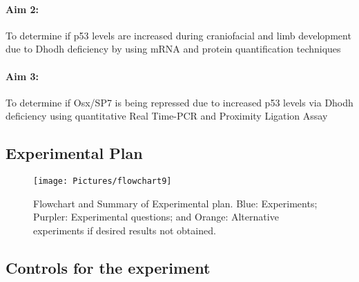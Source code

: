 \documentclass[12pt]{article}
\begin{document}
\paragraph{Aim 2:} To determine if p53 levels are increased during craniofacial and limb development due to Dhodh deficiency by using mRNA and protein quantification techniques
\paragraph{Aim 3:} To determine if Osx/SP7 is being repressed due to increased p53 levels via Dhodh deficiency using quantitative Real Time-PCR and Proximity Ligation Assay

\subsection{Experimental Plan}
\begin{figure}[!htp]
	\centering
	\texttt{[image: Pictures/flowchart9]}
	\caption{Flowchart and Summary of Experimental plan. Blue: Experiments; Purpler: Experimental questions; and Orange: Alternative experiments if desired results not obtained.}
	\label{fig:flowchat}
\end{figure}

\subsection{Controls for the experiment}
\end{document}
